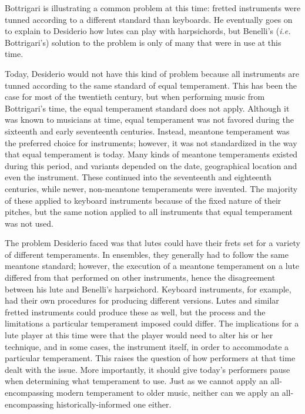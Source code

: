 Bottrigari is illustrating a common problem at this time: fretted instruments
were tunned according to a different standard than keyboards. He eventually goes
on to explain to Desiderio how lutes can play with harpsichords, but Benelli's
(\textit{i.e.} Bottrigari's) solution to the problem is only of many that  were
in use at this time.
  
Today, Desiderio would not have this kind of problem because all instruments are
tunned according to the same standard of equal temperament.  This has been the
case for most of the twentieth century, but when performing music from
Bottrigari's time, the equal temperament standard does not apply.  Although it
was known to musicians at time, equal temperament was not favored during the
sixteenth and early seventeenth centuries.  Instead, meantone temperament was
the preferred choice for instruments; however, it was not standardized in the
way that equal temperament is today.  Many kinds of meantone temperaments
existed during this period, and variants depended on the date, geographical
location and even the instrument.  These continued into the seventeenth and
eighteenth centuries, while newer, non-meantone temperaments were invented.  The
majority of these applied to keyboard instruments because of the fixed nature of
their pitches, but the same notion applied to all instruments that equal
temperament was not used.

The problem Desiderio faced was that lutes could have their frets set for a
variety of different temperaments.  In ensembles, they generally had to follow
the same meantone standard; however, the execution of a meantone temperament on
a lute differed from that performed on other instruments, hence the disagreement
between his lute and Benelli's harpsichord.  Keyboard instruments, for example,
had their own procedures for producing different versions.  Lutes and similar
fretted instruments could produce these as well, but the process and the
limitations a particular temperament imposed could differ. The implications for
a lute player at this time were that the player would need to alter his or her
technique, and in some cases, the instrument itself, in order to accommodate a
particular temperament. This raises the question of how performers at that time
dealt with the issue. More importantly, it should give today's performers pause
when determining what temperament to use.  Just as we cannot apply an all-
encompassing modern temperament to older music, neither can we apply an all-
encompassing historically-informed one either.

